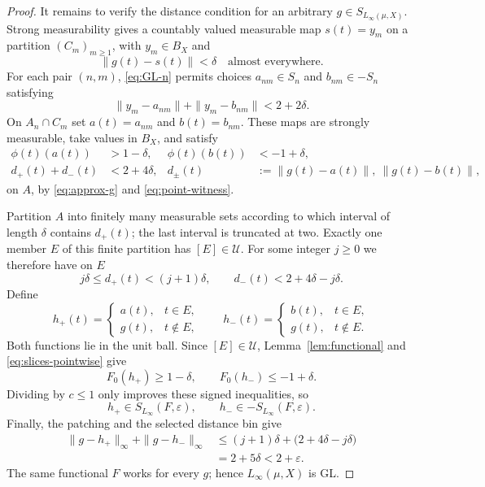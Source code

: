 \documentclass[11pt,a4paper]{article}
\begin{document}
\begin{proof}
It remains to verify the distance condition for an arbitrary
$g\in S_{L_\infty(\mu,X)}$.  Strong measurability gives a countably valued
measurable map $s(t)=y_m$ on a partition $(C_m)_{m\ge1}$, with
$y_m\in B_X$ and
\begin{equation}\label{eq:approx-g}
 \|g(t)-s(t)\|<\delta\quad\text{almost everywhere}.
\end{equation}
For each pair $(n,m)$, \eqref{eq:GL-n} permits choices
$a_{nm}\in S_n$ and $b_{nm}\in-S_n$ satisfying
\begin{equation}\label{eq:point-witness}
 \|y_m-a_{nm}\|+\|y_m-b_{nm}\|<2+2\delta.
\end{equation}
On $A_n\cap C_m$ set $a(t)=a_{nm}$ and $b(t)=b_{nm}$.  These maps are
strongly measurable, take values in $B_X$, and satisfy
\begin{align}
 \phi(t)(a(t))&>1-\delta, &
 \phi(t)(b(t))&<-1+\delta,\label{eq:slices-pointwise}\\
 d_+(t)+d_-(t)&<2+4\delta,
 &d_\pm(t)&:=\|g(t)-a(t)\|,\ \|g(t)-b(t)\|,
 \label{eq:distance-pointwise}
\end{align}
on $A$, by \eqref{eq:approx-g} and \eqref{eq:point-witness}.

Partition $A$ into finitely many measurable sets according to which interval
of length $\delta$ contains $d_+(t)$; the last interval is truncated at two.
Exactly one member $E$ of this finite partition has $[E]\in\mathcal U$.
For some integer $j\ge0$ we therefore have on $E$
\[
 j\delta\le d_+(t)<(j+1)\delta,
 \qquad
 d_-(t)<2+4\delta-j\delta.
\]
Define
\[
 h_+(t)=\begin{cases}a(t),&t\in E,\\g(t),&t\notin E,
 \end{cases}
 \qquad
 h_-(t)=\begin{cases}b(t),&t\in E,\\g(t),&t\notin E.
 \end{cases}
\]
Both functions lie in the unit ball.  Since $[E]\in\mathcal U$,
Lemma~\ref{lem:functional} and \eqref{eq:slices-pointwise} give
\[
 F_0(h_+)\ge1-\delta,
 \qquad F_0(h_-)\le-1+\delta.
\]
Dividing by $c\le1$ only improves these signed inequalities, so
\[
 h_+\in S_{L_\infty}(F,\varepsilon),
 \qquad h_-\in-S_{L_\infty}(F,\varepsilon).
\]
Finally, the patching and the selected distance bin give
\begin{align*}
 \|g-h_+\|_\infty+
 \|g-h_-\|_\infty
 &\le (j+1)\delta+\bigl(2+4\delta-j\delta\bigr)\\
 &=2+5\delta<2+\varepsilon.
\end{align*}
The same functional $F$ works for every $g$; hence
$L_\infty(\mu,X)$ is GL.
\end{proof}
\end{document}
